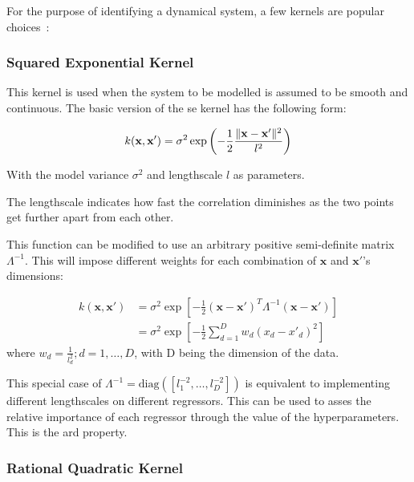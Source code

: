 For the purpose of identifying a dynamical system, a few kernels are popular
choices~\cite{kocijanModellingControlDynamic2016}: 


\subsubsection*{Squared Exponential Kernel}

This kernel is used when the system to be modelled is assumed to be smooth and
continuous. The basic version of the \acrfull{se} kernel has the following form:

\begin{equation}
    k(\mathbf{x}, \mathbf{x'}) = \sigma^2 \exp{\left(- \frac{1}{2}\frac{\lVert\mathbf{x} -
    \mathbf{x'}\rVert^2}{l^2}\right)}
\end{equation}

With the model variance $\sigma^2$ and lengthscale $l$ as parameters.

The lengthscale indicates how fast the correlation diminishes as the two points
get further apart from each other.

This function can be modified to use an arbitrary positive semi-definite matrix
$\Lambda^{-1}$.
This will impose different weights for each combination of $\mathbf{x}$ and
$\mathbf{x'}$'s dimensions:

\begin{equation}
    \begin{aligned}
        k(\mathbf{x}, \mathbf{x'})
        &= \sigma^2\exp{\left[-\frac{1}{2} (\mathbf{x} - \mathbf{x'})^T \Lambda^{-1}
        (\mathbf{x} - \mathbf{x'})\right]} \\
        &= \sigma^2 \exp{\left[-\frac{1}{2}\sum_{d=1}^D w_d(x_d - x'_d)^2\right]}
    \end{aligned}
\end{equation}
where $w_d = \frac{1}{l_d^2}; d = 1 ,\dots, D$, with D being the dimension of the
data.

This special case of $\Lambda^{-1} = \text{diag}{\left([l_1^{-2},\dots,l_D^{-2}]\right)}$
is equivalent to implementing different lengthscales on different regressors.
This can be used to asses the relative importance of each regressor through the
value of the hyperparameters. This is the \acrfull{ard} property.


\subsubsection*{Rational Quadratic Kernel}

